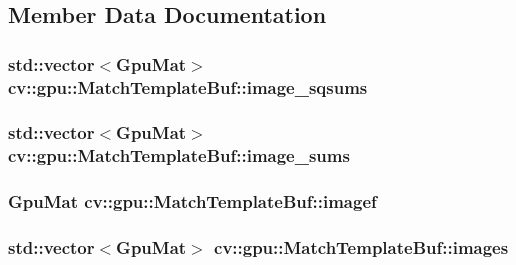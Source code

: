 \subsection{Member Data Documentation}
\hypertarget{structcv_1_1gpu_1_1MatchTemplateBuf_a5c5e8f5ed03328f27921ef1b0b361ad7}{
\subsubsection[{image\-\_\-sqsums}]{\setlength{\rightskip}{0pt plus 5cm}std\-::vector$<$Gpu\-Mat$>$ cv\-::gpu\-::\-Match\-Template\-Buf\-::image\-\_\-sqsums}}\label{structcv_1_1gpu_1_1MatchTemplateBuf_a5c5e8f5ed03328f27921ef1b0b361ad7}
\hypertarget{structcv_1_1gpu_1_1MatchTemplateBuf_aba37eb8859e38df75ec1632875c00b40}{
\subsubsection[{image\-\_\-sums}]{\setlength{\rightskip}{0pt plus 5cm}std\-::vector$<$Gpu\-Mat$>$ cv\-::gpu\-::\-Match\-Template\-Buf\-::image\-\_\-sums}}\label{structcv_1_1gpu_1_1MatchTemplateBuf_aba37eb8859e38df75ec1632875c00b40}
\hypertarget{structcv_1_1gpu_1_1MatchTemplateBuf_ac4c593fec0659d07bdeb166973ea24e5}{
\subsubsection[{imagef}]{\setlength{\rightskip}{0pt plus 5cm}Gpu\-Mat cv\-::gpu\-::\-Match\-Template\-Buf\-::imagef}}\label{structcv_1_1gpu_1_1MatchTemplateBuf_ac4c593fec0659d07bdeb166973ea24e5}
\hypertarget{structcv_1_1gpu_1_1MatchTemplateBuf_ae12cf962682edaea5914cb3d8a53b7eb}{
\subsubsection[{images}]{\setlength{\rightskip}{0pt plus 5cm}std\-::vector$<$Gpu\-Mat$>$ cv\-::gpu\-::\-Match\-Template\-Buf\-::images}}\label{structcv_1_1gpu_1_1MatchTemplateBuf_ae12cf962682edaea5914cb3d8a53b7eb}
